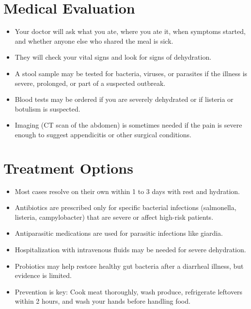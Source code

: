 \section*{Medical Evaluation}
\begin{itemize}
  \item Your doctor will ask what you ate, where you ate it, when symptoms started, and whether anyone else who shared the meal is sick.
  \item They will check your vital signs and look for signs of dehydration.
  \item A stool sample may be tested for bacteria, viruses, or parasites if the illness is severe, prolonged, or part of a suspected outbreak.
  \item Blood tests may be ordered if you are severely dehydrated or if listeria or botulism is suspected.
  \item Imaging (CT scan of the abdomen) is sometimes needed if the pain is severe enough to suggest appendicitis or other surgical conditions.
\end{itemize}

\section*{Treatment Options}
\begin{itemize}
  \item Most cases resolve on their own within 1 to 3 days with rest and hydration.
  \item Antibiotics are prescribed only for specific bacterial infections (salmonella, listeria, campylobacter) that are severe or affect high-risk patients.
  \item Antiparasitic medications are used for parasitic infections like giardia.
  \item Hospitalization with intravenous fluids may be needed for severe dehydration.
  \item Probiotics may help restore healthy gut bacteria after a diarrheal illness, but evidence is limited.
  \item Prevention is key: Cook meat thoroughly, wash produce, refrigerate leftovers within 2 hours, and wash your hands before handling food.
\end{itemize}


